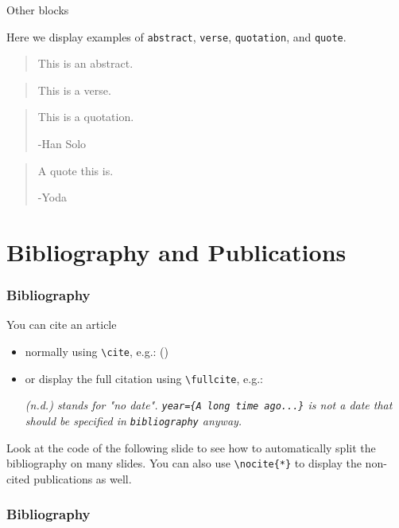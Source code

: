 \documentclass[usenames,dvipsnames,10pt,aspectratio=169]{beamer}
\begin{document}
\begin{frame}{Other blocks}

Here we display examples of \texttt{abstract}, \texttt{verse}, \texttt{quotation}, and \texttt{quote}.

\vskip 0.5cm

\begin{abstract}
This is an abstract.
\end{abstract}
\begin{verse}
This is a verse.
\end{verse}
\begin{quotation}
This is a quotation.

\raggedleft -Han Solo
\end{quotation}
\begin{quote}
A quote this is.

\raggedleft -Yoda
\end{quote}

\end{frame}

\section{Bibliography and Publications}
\begin{frame}[fragile]
\frametitle{Bibliography}

You can cite an article
\begin{itemize}
\item normally using \texttt{\textbackslash cite}, e.g.: (\cite{article1})
\item or display the full citation using \texttt{\textbackslash fullcite}, e.g.:   \\\vspace{0.4cm}

\textit{(n.d.) stands for "no date". \texttt{year=\{A long time ago...\}} is not a date that should be specified in \texttt{bibliography} anyway.}
\end{itemize}

\vskip 0.5cm
Look at the code of the following slide to see how to automatically split the bibliography on many slides. You can also use \texttt{\textbackslash nocite\{*\}} to display the non-cited publications as well.

\end{frame}

\begin{frame}[t,allowframebreaks]
\frametitle{Bibliography}

\nocite{*} %

\printbibliography

\end{frame}
\end{document}
